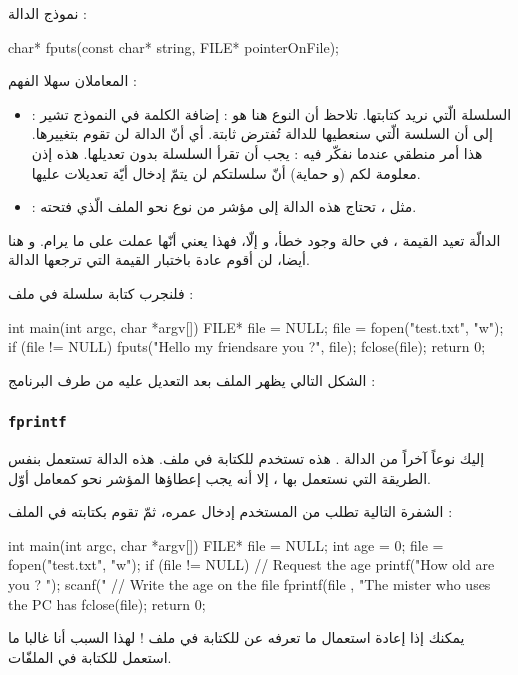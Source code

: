 نموذج الدالة :

\begin{Csource}
char* fputs(const char* string, FILE* pointerOnFile);
\end{Csource}

المعاملان سهلا الفهم :
\begin{itemize}
  \item {} :
السلسلة الّتي نريد كتابتها. تلاحظ أن النوع هنا هو
 :
إضافة الكلمة
في النموذج تشير إلى أن السلسة الّتي سنعطيها للدالة تُفترض ثابتة. أي أنّ الدالة لن تقوم بتغييرها. هذا أمر منطقي عندما نفكّر فيه :
يجب أن تقرأ السلسلة بدون تعديلها. هذه إذن معلومة لكم (و حماية) أنّ سلسلتكم لن يتمّ إدخال أيّة تعديلات عليها.
  \item {} :
 مثل
،
 تحتاج هذه الدالة إلى مؤشر من نوع
نحو الملف الّذي فتحته.
\end{itemize}

الدالّة تعيد القيمة
،
في حالة وجود خطأ، و إلّا، فهذا يعني أنّها عملت على ما يرام. و هنا أيضا، لن أقوم عادة باختبار القيمة التي ترجعها الدالة.

فلنجرب كتابة سلسلة في ملف :

\begin{Csource}
int main(int argc, char *argv[])
{
	FILE* file = NULL;
	file = fopen("test.txt", "w");
	if (file != NULL)
	{
    	 	fputs("Hello my friends\nHow are you ?", file);
    	 	fclose(file);
	}
	return 0;
}
\end{Csource}

الشكل التالي يظهر الملف بعد التعديل عليه من طرف البرنامج :


\subsubsection{\texttt{fprintf}}
إليك نوعاً آخراً من الدالة
.
هذه تستخدم للكتابة في ملف. هذه الدالة تستعمل بنفس الطريقة التي نستعمل بها
،
إلا أنه يجب إعطاؤها المؤشر نحو
كمعامل أوّل.

الشفرة التالية تطلب من المستخدم إدخال عمره، ثمّ تقوم بكتابته في الملف :

\begin{Csource}
int main(int argc, char *argv[])
{
	FILE* file = NULL;
	int age = 0;
	file = fopen("test.txt", "w");
	if (file != NULL)
	{
    		// Request the age
    		printf("How old are you ? ");
    		scanf("%
    		// Write the age on the file
    		fprintf(file , "The mister who uses the PC has %
    		fclose(file);
	}
 	return 0;
 }
\end{Csource}


يمكنك إذا إعادة استعمال ما تعرفه عن
للكتابة في ملف ! لهذا السبب أنا غالبا ما استعمل
للكتابة في الملفّات.
